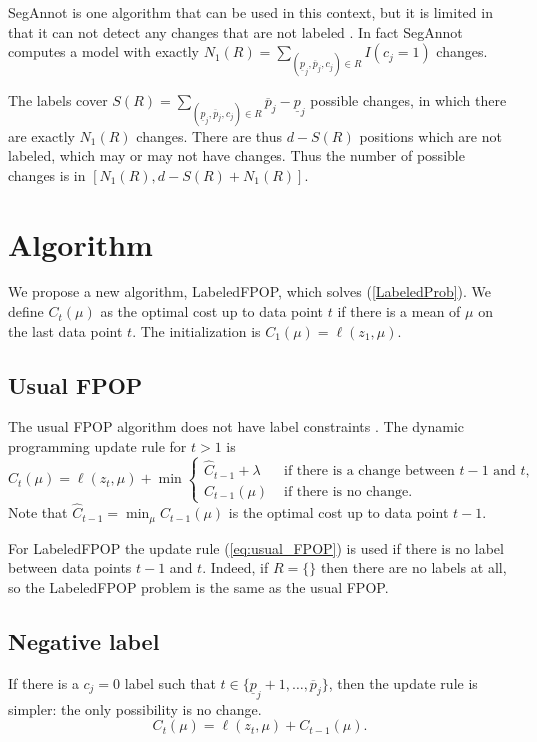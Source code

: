 \documentclass{article}
\begin{document}
SegAnnot is one algorithm that can be used in this context, but it is
limited in that it can not detect any changes that are not labeled
\citep{Hocking2012}. In fact SegAnnot computes a model with exactly
$N_1(R)=\sum_{(\underline p_j, \overline p_j, c_j)\in R} I(c_j=1)$ changes.

The labels cover
$S(R)=\sum_{(\underline p_j, \overline p_j, c_j)\in R} \overline
p_j-\underline p_j$ possible changes, in which there are exactly
$N_1(R)$ changes. There are thus $d-S(R)$ positions which are not
labeled, which may or may not have changes. Thus the number of
possible changes is in $[N_1(R), d-S(R)+N_1(R)]$.

\section{Algorithm}

We propose a new algorithm, LabeledFPOP, which solves
(\ref{LabeledProb}). We define $C_t(\mu)$ as the optimal cost up to
data point $t$ if there is a mean of $\mu$ on the last data point
$t$. The initialization is $C_1(\mu)= \ell(z_1, \mu)$. 

\subsection{Usual FPOP}
The usual FPOP algorithm does not have label constraints
\citep{Maidstone2016}. The dynamic programming update rule for $t>1$
is
\begin{equation}
  \label{eq:usual_FPOP}
  C_t(\mu)=\ell(z_t, \mu) + \min
  \begin{cases}
\hat C_{t-1}+\lambda &\text{ if there is a change between $t-1$ and $t$,}\\
C_{t-1}(\mu) & \text{ if there is no change.}
  \end{cases}
\end{equation}
Note that $\hat C_{t-1}=\min_\mu C_{t-1}(\mu)$ is the optimal cost up
to data point $t-1$.

For LabeledFPOP the update rule (\ref{eq:usual_FPOP}) is used if there
is no label between data points $t-1$ and $t$. Indeed, if $R=\{\}$
then there are no labels at all, so the LabeledFPOP problem is the
same as the usual FPOP.

\subsection{Negative label}
If there is a $c_j=0$ label such that
$t \in\{\underline p_j+1, \dots,  \overline p_j\}$, then the update rule is
simpler: the only possibility is no change.
\begin{equation}
  \label{eq:negative_update}
  C_t(\mu)=\ell(z_t,\mu)+
C_{t-1}(\mu).
\end{equation}
\end{document}
